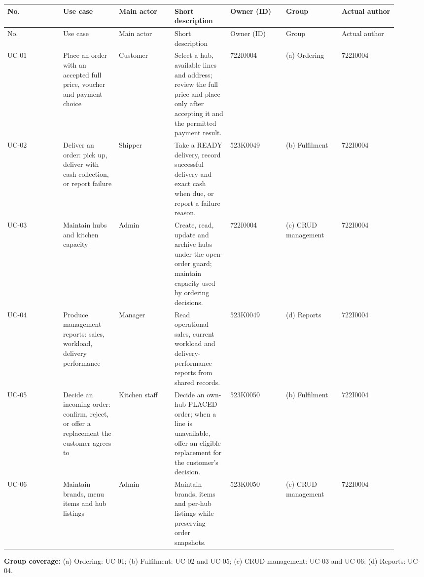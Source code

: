 \begin{landscape}
\begingroup\footnotesize
\begin{longtable}{>{\raggedright\arraybackslash}p{0.1314\linewidth}>{\raggedright\arraybackslash}p{0.1314\linewidth}>{\raggedright\arraybackslash}p{0.1314\linewidth}>{\raggedright\arraybackslash}p{0.1314\linewidth}>{\raggedright\arraybackslash}p{0.1314\linewidth}>{\raggedright\arraybackslash}p{0.1314\linewidth}>{\raggedright\arraybackslash}p{0.1314\linewidth}}
No. & Use case & Main actor & Short description & Owner (ID) & Group & Actual author \\
\hline\endfirsthead
No. & Use case & Main actor & Short description & Owner (ID) & Group & Actual author \\
\hline\endhead
UC-01 & Place an order with an accepted full price, voucher and payment choice & Customer & Select a hub, available lines and address; review the full price and place only after accepting it and the permitted payment result. & 722I0004 & (a) Ordering & 722I0004 \\
UC-02 & Deliver an order: pick up, deliver with cash collection, or report failure & Shipper & Take a READY delivery, record successful delivery and exact cash when due, or report a failure reason. & 523K0049 & (b) Fulfilment & 722I0004 \\
UC-03 & Maintain hubs and kitchen capacity & Admin & Create, read, update and archive hubs under the open-order guard; maintain capacity used by ordering decisions. & 722I0004 & (c) CRUD management & 722I0004 \\
UC-04 & Produce management reports: sales, workload, delivery performance & Manager & Read operational sales, current workload and delivery-performance reports from shared records. & 523K0049 & (d) Reports & 722I0004 \\
UC-05 & Decide an incoming order: confirm, reject, or offer a replacement the customer agrees to & Kitchen staff & Decide an own-hub PLACED order; when a line is unavailable, offer an eligible replacement for the customer's decision. & 523K0050 & (b) Fulfilment & 722I0004 \\
UC-06 & Maintain brands, menu items and hub listings & Admin & Maintain brands, items and per-hub listings while preserving order snapshots. & 523K0050 & (c) CRUD management & 722I0004 \\
\end{longtable}
\endgroup
\end{landscape}
\textbf{Group coverage:} (a) Ordering: UC-01; (b) Fulfilment: UC-02 and UC-05; (c) CRUD management: UC-03 and UC-06; (d) Reports: UC-04.

